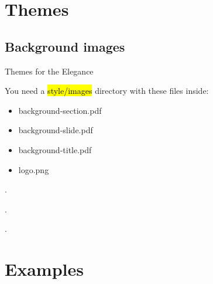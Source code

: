 




\maketitle


\section{Themes}

\subsection{Background images}

\begin{xframe}{Themes for the Elegance}

    You need a \hl{style/images} directory
    with these files inside:

    \begin{itemize}
        \item background-section.pdf
        \item background-slide.pdf
        \item background-title.pdf
        \item logo.png
    \end{itemize}

\end{xframe}


{
\begin{frame}[plain]
    .
\end{frame}
}


{
\begin{frame}[plain]
    .
\end{frame}
}


{
\begin{frame}[plain]
    .
\end{frame}
}





\section{Examples}

